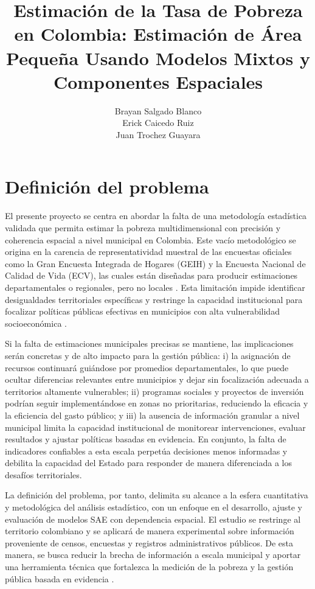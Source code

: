 \documentclass{unipd-thesis-modern} %
\title{Estimación de la Tasa de Pobreza en Colombia: Estimación de Área Pequeña Usando Modelos Mixtos y Componentes Espaciales}
\author{Brayan Salgado Blanco \\Erick Caicedo Ruiz \\Juan Trochez Guayara
}
\begin{document}
\renewcommand{\tablename}{Tabla}
\renewcommand{\listfigurename}{Lista de figuras}
\renewcommand{\listtablename}{Lista de tablas}
    \frontmatter
    \newpage
    
    \newpage
    \mainmatter
    \chapter{Definición del problema}
El presente proyecto se centra en abordar la falta de una metodología estadística validada que permita estimar la pobreza multidimensional con precisión y coherencia espacial a nivel municipal en Colombia. Este vacío metodológico se origina en la carencia de representatividad muestral de las encuestas oficiales como la Gran Encuesta Integrada de Hogares (GEIH) y la Encuesta Nacional de Calidad de Vida (ECV), las cuales están diseñadas para producir estimaciones departamentales o regionales, pero no locales \cite{DANE_ENCV_2022}. Esta limitación impide identificar desigualdades territoriales específicas y restringe la capacidad institucional para focalizar políticas públicas efectivas en municipios con alta vulnerabilidad socioeconómica \cite{CEPAL_PanoramaSocial_2023}.

Si la falta de estimaciones municipales precisas se mantiene, las implicaciones serán concretas y de alto impacto para la gestión pública: i) la asignación de recursos continuará guiándose por promedios departamentales, lo que puede ocultar diferencias relevantes entre municipios y dejar sin focalización adecuada a territorios altamente vulnerables; ii) programas sociales y proyectos de inversión podrían
seguir implementándose en zonas no prioritarias, reduciendo la eficacia y la eficiencia del gasto público;
y iii) la ausencia de información granular a nivel municipal limita la capacidad institucional de monitorear intervenciones, evaluar resultados y ajustar políticas basadas en evidencia. En conjunto, la falta de indicadores confiables a esta escala perpetúa decisiones menos informadas y debilita la capacidad del Estado para responder de manera diferenciada a los desafíos territoriales.

La definición del problema, por tanto, delimita su alcance a la esfera cuantitativa y metodológica del análisis estadístico, con un enfoque en el desarrollo, ajuste y evaluación de modelos SAE con dependencia espacial. El estudio se restringe al territorio colombiano y se aplicará de manera experimental sobre información proveniente de censos, encuestas y registros administrativos públicos.
De esta manera, se busca reducir la brecha de información a escala municipal y aportar una herramienta técnica que fortalezca la medición de la pobreza y la gestión pública basada en evidencia \cite{MolinaRao_2010} \cite{PratesiSalvati_2019} \cite{RaoMolina_2015}.
    
\end{document}
